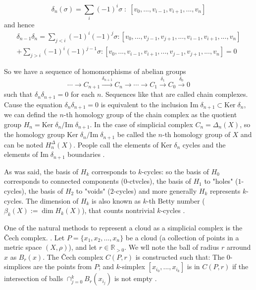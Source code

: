 \documentclass[a4paper, 12pt]{article}
\newcommand{\Image}{\text{Im}\;}
\newcommand{\Ker}{\text{Ker}\;}
\begin{document}
$$\delta_n(\sigma) = \sum_i (-1)^i \sigma \;:\; [v_0, ..., v_{i-1}, v_{i+1}, ..., v_n]$$
and hence
$$
\begin{matrix}
	\delta_{n-1}\delta_{n} = 
	\sum\limits_{j<i} (-1)^i(-1)^{j} \sigma : [v_0, ..., v_{j-1}, v_{j+1}, ..., v_{i-1}, v_{i+1}, ..., v_n] \\
	+ 
	\sum\limits_{j>i} (-1)^i(-1)^{j-1} \sigma : [v_0, ..., v_{i-1}, v_{i+1}, ..., v_{j-1}, v_{j+1}, ..., v_n] = 0
\end{matrix}
$$
\par So we have a sequence of homomorphisms of abelian groups
$$
	\cdots \to 
	C_{n+1}  \xrightarrow{\delta_{n+1}}
	C_{n}  \to
	\cdots \to 
	C_{1}  \xrightarrow{\delta_{1}}
	C_{0}  \xrightarrow{\delta_{0}} 0
$$
such that $\delta_n\delta_{n+1} = 0$ for each $n$. Sequences like that are called chain complexes. Cause the equation $\delta_n\delta_{n+1} = 0$ is equivalent to the inclusion $\Image \delta_{n+1} \subset \Ker \delta_n$, we can defind the $n$-th homology group of the chain complex as the quotient group $H_n = \Ker\delta_n/\Image\delta_{n+1}$. In the case of simplicial complex $C_n = \Delta_n(X)$, so the homology group $\Ker\delta_n/\Image\delta_{n+1}$ be called the $n$-th homology group of $X$ and can be noted $H_n^\Delta(X)$. People call the elements of $\Ker\delta_n$ cycles and the elements of $\Image\delta_{n+1}$ boundaries \cite{hatcher}. 
\par As was said, the basis of $H_k$ corresponds to $k$-cycles: so the basis of $H_0$ corresponds to connected components ($0$-ctvcles), the basis of $H_1$ to "holes" ($1$-cycles), the basis of $H_2$ to "voids" ($2$-cycles) and more generally $H_k$ represents $k$-cycles. The dimension of $H_k$ is also known as $k$-th Betty number ($\beta_k(X) := \dim H_k(X)$), that counts nontrivial $k$-cycles \cite{bobprimoz}.
\par One of the natural methods to represent a cloud as a simplicial complex is the Čech complex. \cite{ghrist}.
Let $P = \{x_1, x_2, ..., x_n\}$ be a cloud (a collection of points in a metric space $(X, \rho)$), and let $r\in\mathbb{R}_{>0}$. We wll note the ball of radius $r$ arround $x$ as $B_r(x)$. The Čech complex $C(P, r)$ is constructed such that: The $0$-simplices are the points from $P$; and $k$-simplex $[x_{i_0}, ..., x_{i_k}]$ is in $C(P, r)$ if the intersection of balls $\cap_{j=0}^k B_r(x_{i_j})$ is not empty \cite{vanish}.
\end{document}
